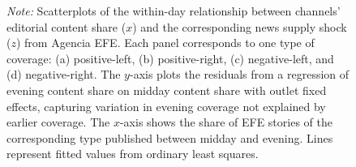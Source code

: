\documentclass[12pt]{article}
\begin{document}
\begin{figure}[!htb]
\begin{tabular}{@{}cc@{}}
		\end{tabular}
		\caption*{\small \textit{Note:} Scatterplots of the within-day relationship between channels' editorial content share ($x$) 
			and the corresponding news supply shock ($z$) from Agencia EFE. Each panel corresponds to one type of coverage: 
			(a) positive-left, (b) positive-right, (c) negative-left, and (d) negative-right. The $y$-axis plots the residuals from 
			a regression of evening content share on midday content share with outlet fixed effects, capturing variation in evening 
			coverage not explained by earlier coverage. The $x$-axis shows the share of EFE stories of the corresponding type published 
			between midday and evening. Lines represent fitted values from ordinary least squares. }
		\label{fig:diff}
	\end{figure}
	
	
	
\end{document}
